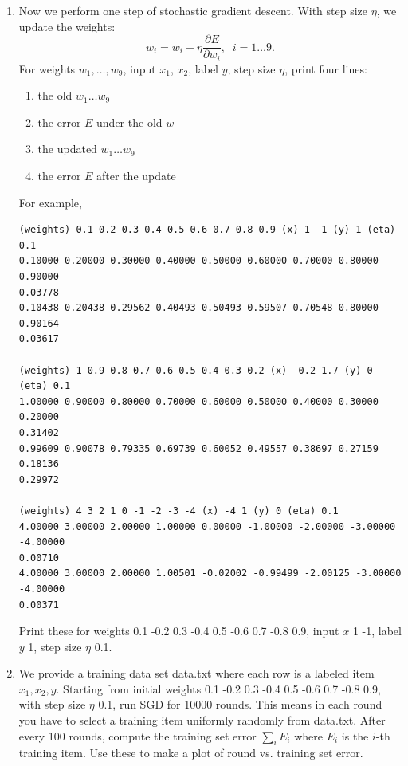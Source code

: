 \documentclass[a4paper]{article}
\theoremstyle{definition}
\begin{document}
\begin{enumerate}
\begin{verbatim}
(weights) 1 0.9 0.8 0.7 0.6 0.5 0.4 0.3 0.2 (input) -0.2 1.7 (y) 0
0.03910 -0.00782 0.06647 0.02606 -0.00521 0.04431 0.13032 0.28411 0.18636

(weights) 4 3 2 1 0 -1 -2 -3 -4 (input) -4 1 (y) 0
0.00000 0.00000 0.00000 -0.05006 0.20025 -0.05006 0.01252 0.00000 0.00000
\end{verbatim}
Now print $\frac{\partial E}{\partial w_1}, \ldots \frac{\partial E}{\partial w_9}$
for weights 0.1 -0.2 0.3 -0.4 0.5 -0.6 0.7 -0.8 0.9, input 1 -1, and label $y=1$.

\item
Now we perform one step of stochastic gradient descent.  With step size $\eta$, we update the weights:
$$w_i = w_i - \eta \frac{\partial E}{\partial w_i}, \;\; i=1\ldots 9.$$
For weights $w_1, \ldots, w_9$, input $x_1$, $x_2$, label $y$, step size $\eta$,
print four lines:
\begin{enumerate}
\item the old $w_1 \ldots w_9$
\item the error $E$ under the old $w$
\item the updated $w_1 \ldots w_9$
\item the error $E$ after the update
\end{enumerate}
For example,
\begin{verbatim}
(weights) 0.1 0.2 0.3 0.4 0.5 0.6 0.7 0.8 0.9 (x) 1 -1 (y) 1 (eta) 0.1
0.10000 0.20000 0.30000 0.40000 0.50000 0.60000 0.70000 0.80000 0.90000
0.03778
0.10438 0.20438 0.29562 0.40493 0.50493 0.59507 0.70548 0.80000 0.90164
0.03617

(weights) 1 0.9 0.8 0.7 0.6 0.5 0.4 0.3 0.2 (x) -0.2 1.7 (y) 0 (eta) 0.1
1.00000 0.90000 0.80000 0.70000 0.60000 0.50000 0.40000 0.30000 0.20000
0.31402
0.99609 0.90078 0.79335 0.69739 0.60052 0.49557 0.38697 0.27159 0.18136
0.29972

(weights) 4 3 2 1 0 -1 -2 -3 -4 (x) -4 1 (y) 0 (eta) 0.1
4.00000 3.00000 2.00000 1.00000 0.00000 -1.00000 -2.00000 -3.00000 -4.00000
0.00710
4.00000 3.00000 2.00000 1.00501 -0.02002 -0.99499 -2.00125 -3.00000 -4.00000
0.00371
\end{verbatim}
Print these for weights 0.1 -0.2 0.3 -0.4 0.5 -0.6 0.7 -0.8 0.9, input $x$ 1 -1, label $y$ 1, step size $\eta$ 0.1.

\item
We provide a training data set data.txt where each row is a labeled item $x_1, x_2, y$.
Starting from initial weights 0.1 -0.2 0.3 -0.4 0.5 -0.6 0.7 -0.8 0.9, with step size $\eta$ 0.1,
run SGD for 10000 rounds.  This means in each round you have to select a training item uniformly randomly from data.txt.
After every 100 rounds, compute the training set error $\sum_i E_i$ where $E_i$ is the $i$-th training item.
Use these to make a plot of round vs. training set error.

\end{enumerate}
\end{document}
